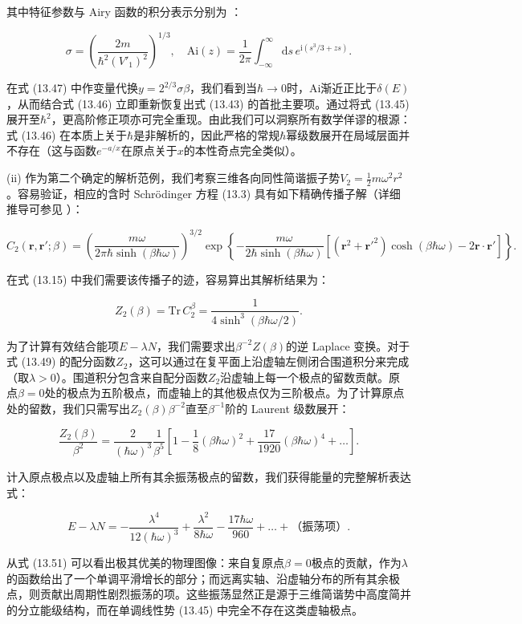 其中特征参数与 Airy 函数的积分表示分别为 \cite{AS65}：

\[
\sigma=\left(\frac{2m}{\hbar^{2}(V'_{1})^{2}}\right)^{1/3},\quad\mathrm{Ai}(z)=\frac{1}{2\pi}\int^{\infty}_{-\infty}\mathrm{d}s\,e^{\mathrm{i}(s^{3}/3+zs)}.
\]

在式 (13.47) 中作变量代换$y=2^{2/3}\sigma\beta$，我们看到当$\hbar\to0$时，$\mathrm{Ai}$渐近正比于$\delta(E)$，从而结合式
(13.46) 立即重新恢复出式 (13.43) 的首批主要项。通过将式 (13.45) 展开至$\hbar^{2}$，更高阶修正项亦可完全重现。由此我们可以洞察所有数学佯谬的根源：式
(13.46) 在本质上关于$\hbar$是非解析的，因此严格的常规$\hbar$幂级数展开在局域层面并不存在（这与函数$e^{-a/x}$在原点关于$x$的本性奇点完全类似）。

(ii) 作为第二个确定的解析范例，我们考察三维各向同性简谐振子势$V_{2}=\frac{1}{2}m\omega^{2}r^{2}$。容易验证，相应的含时
Schrödinger 方程 (13.3) 具有如下精确传播子解（详细推导可参见 \cite{Kr64}）：

\[
C_{2}(\boldsymbol{r},\boldsymbol{r}';\beta)=\left(\frac{m\omega}{2\pi\hbar\sinh(\beta\hbar\omega)}\right)^{3/2}\exp\left\{ -\frac{m\omega}{2\hbar\sinh(\beta\hbar\omega)}\left[(\boldsymbol{r}^{2}+\boldsymbol{r}'^{2})\cosh(\beta\hbar\omega)-2\boldsymbol{r}\cdot\boldsymbol{r}'\right]\right\} .
\]

在式 (13.15) 中我们需要该传播子的迹，容易算出其解析结果为：

\[
Z_{2}(\beta)=\mathrm{Tr}\,C^{\beta}_{2}=\frac{1}{4\sinh^{3}(\beta\hbar\omega/2)}.
\]

为了计算有效结合能项$E-\lambda N$，我们需要求出$\beta^{-2}Z(\beta)$的逆 Laplace 变换。对于式
(13.49) 的配分函数$Z_{2}$，这可以通过在复平面上沿虚轴左侧闭合围道积分来完成（取$\lambda>0$）。围道积分包含来自配分函数$Z_{2}$沿虚轴上每一个极点的留数贡献。原点$\beta=0$处的极点为五阶极点，而虚轴上的其他极点仅为三阶极点。为了计算原点处的留数，我们只需写出$Z_{2}(\beta)\beta^{-2}$直至$\beta^{-1}$阶的
Laurent 级数展开：

\[
\frac{Z_{2}(\beta)}{\beta^{2}}=\frac{2}{(\hbar\omega)^{3}}\frac{1}{\beta^{5}}\left[1-\frac{1}{8}(\beta\hbar\omega)^{2}+\frac{17}{1920}(\beta\hbar\omega)^{4}+\dots\right].
\]

计入原点极点以及虚轴上所有其余振荡极点的留数，我们获得能量的完整解析表达式：

\[
E-\lambda N=-\frac{\lambda^{4}}{12(\hbar\omega)^{3}}+\frac{\lambda^{2}}{8\hbar\omega}-\frac{17\hbar\omega}{960}+\dots+\text{（振荡项）}.
\]

从式 (13.51) 可以看出极其优美的物理图像：来自复原点$\beta=0$极点的贡献，作为$\lambda$的函数给出了一个单调平滑增长的部分；而远离实轴、沿虚轴分布的所有其余极点，则贡献出周期性剧烈振荡的项。这些振荡显然正是源于三维简谐势中高度简并的分立能级结构，而在单调线性势
(13.45) 中完全不存在这类虚轴极点。


